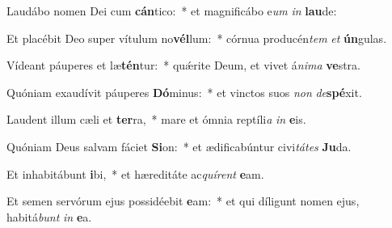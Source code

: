\item Laudábo nomen Dei cum \textbf{cán}tico:~* et magnificábo e\tinyhspace\textit{um} \textit{in} \textbf{lau}de:
\item Et placébit Deo super vítulum no\textbf{vél}lum:~* córnua producén\textit{tem} \textit{et} \textbf{ún}gulas.
\item Vídeant páuperes et læ\textbf{tén}tur:~* quǽrite Deum, et vivet á\tinyhspace\textit{nima} \textbf{ve}stra.
\item Quóniam exaudívit páuperes \textbf{Dó}minus:~* et vinctos suos \textit{non} \textit{de}\textbf{spé}xit.
\item Laudent illum cæli et \textbf{ter}ra,~* mare et ómnia reptíli\tinyhspace\textit{a} \textit{in} \textbf{e}is.
\item Quóniam Deus salvam fáciet \textbf{Si}on:~* et ædificabúntur civi\textit{tátes} \textbf{Ju}da.
\item Et inhabitábunt \textbf{i}bi,~* et hæreditáte ac\textit{quírent} \textbf{e}am.
\item Et semen servórum ejus possidéebit \textbf{e}am:~* et qui díligunt nomen ejus, habitá\textit{bunt} \textit{in} \textbf{e}a.
